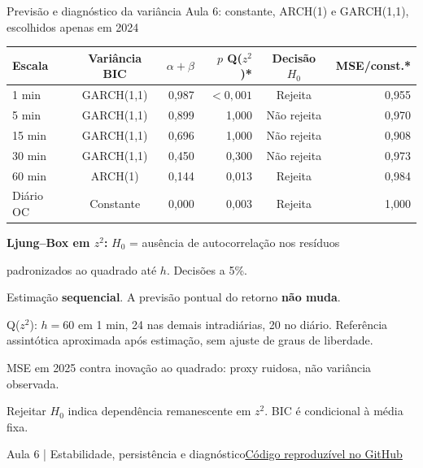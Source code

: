 \documentclass[aspectratio=169,10pt]{beamer}
\newcommand{\source}[2]{\par\vfill{\raggedright\tiny\color{muted}#1\quad\href{#2}{Código reproduzível no GitHub}\par}}
\newcommand{\tagline}[1]{{\small\color{teal}#1}\par\medskip}
\begin{document}
\begin{frame}[t]{Previsão e diagnóstico da variância}
\tagline{Aula 6: constante, ARCH(1) e GARCH(1,1), escolhidos apenas em 2024}
\centering\small\begin{tabular}{lcrrcr}
\toprule
Escala & Variância BIC & $\alpha+\beta$ & $p$ Q($z^2$)* & Decisão $H_0$ & MSE/const.* \\ \midrule
1 min & GARCH(1,1) & 0,987 & $<0{,}001$ & \alert{Rejeita} & 0,955 \\
5 min & GARCH(1,1) & 0,899 & 1,000 & Não rejeita & 0,970 \\
15 min & GARCH(1,1) & 0,696 & 1,000 & Não rejeita & 0,908 \\
30 min & GARCH(1,1) & 0,450 & 0,300 & Não rejeita & 0,973 \\
60 min & ARCH(1) & 0,144 & 0,013 & \alert{Rejeita} & 0,984 \\
Diário OC & Constante & 0,000 & 0,003 & \alert{Rejeita} & 1,000 \\
\bottomrule
\end{tabular}\par
\raggedright\medskip\small\textbf{Ljung--Box em $z^2$:} $H_0$ = ausência de autocorrelação nos resíduos\par padronizados ao quadrado até $h$. Decisões a 5\%.\par\smallskip Estimação \textbf{sequencial}. A previsão pontual do retorno \textbf{não muda}.\par\smallskip \scriptsize *Q($z^2$): $h=60$ em 1 min, 24 nas demais intradiárias, 20 no diário. Referência assintótica aproximada após estimação, sem ajuste de graus de liberdade.\par MSE em 2025 contra inovação ao quadrado: proxy ruidosa, não variância observada.\par Rejeitar $H_0$ indica dependência remanescente em $z^2$. BIC é condicional à média fixa.
\source{Aula 6 | Estabilidade, persistência e diagnóstico}{https://github.com/avilarenan/EAD6034/blob/1782cade2ed752ce6b7c1b8b10c316445aef2626/src/ead6034/conditional_volatility.py}
\end{frame}
\end{document}
